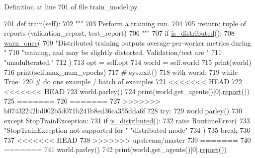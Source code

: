 Definition at line 701 of file train\+\_\+model.\+py.


\begin{DoxyCode}
701     \textcolor{keyword}{def }\hyperlink{namespaceprojects_1_1mastering__the__dungeon_1_1mturk_1_1tasks_1_1MTD_1_1run_a36a5f4f6f9df0611a6818610518d2cf0}{train}(self):
702         \textcolor{stringliteral}{"""}
703 \textcolor{stringliteral}{        Perform a training run.}
704 \textcolor{stringliteral}{}
705 \textcolor{stringliteral}{        :return: tuple of reports (validation\_report, test\_report)}
706 \textcolor{stringliteral}{        """}
707         \textcolor{keywordflow}{if} \hyperlink{namespaceparlai_1_1utils_1_1distributed_a023acb5e3b66e1f27e21247c35661279}{is\_distributed}():
708             \hyperlink{namespaceparlai_1_1utils_1_1misc_acf146e70ea7f6867969a7c2b545d4b4b}{warn\_once}(
709                 \textcolor{stringliteral}{"Distributed training outputs average-per-worker metrics during "}
710                 \textcolor{stringliteral}{"training, and may be slightly distorted. Validation/test are "}
711                 \textcolor{stringliteral}{"unadulterated."}
712             )
713         opt = self.opt
714         world = self.world
715         print(world)
716         print(self.max\_num\_epochs)
717         \textcolor{comment}{# sys.exit()}
718         with world:
719             \textcolor{keywordflow}{while} \textcolor{keyword}{True}:
720                 \textcolor{comment}{# do one example / batch of examples}
721 <<<<<<< HEAD
722 <<<<<<< HEAD
723                 world.parley()
724                 print(world.get\_agents()[0].\hyperlink{namespaceprojects_1_1convai2_1_1eval__f1_a01a47b9c08dad189837a51f085defc45}{report}())
725 =======
726 =======
727 >>>>>>> b07432242bd002b5d071b241b8ed36ca355dda6f
728                 \textcolor{keywordflow}{try}:
729                     world.parley()
730                 \textcolor{keywordflow}{except} StopTrainException:
731                     \textcolor{keywordflow}{if} \hyperlink{namespaceparlai_1_1utils_1_1distributed_a023acb5e3b66e1f27e21247c35661279}{is\_distributed}():
732                         \textcolor{keywordflow}{raise} RuntimeError(
733                             \textcolor{stringliteral}{"StopTrainException not supported for "} \textcolor{stringliteral}{"distributed mode"}
734                         )
735                     \textcolor{keywordflow}{break}
736 
737 <<<<<<< HEAD
738 >>>>>>> upstream/master
739 =======
740 =======
741                 world.parley()
742                 print(world.get\_agents()[0].\hyperlink{namespaceprojects_1_1convai2_1_1eval__f1_a01a47b9c08dad189837a51f085defc45}{report}())

\end{DoxyCode}
